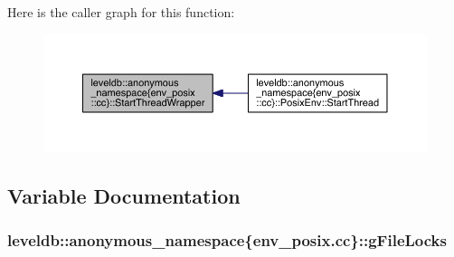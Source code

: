Here is the caller graph for this function\+:
\nopagebreak
\begin{figure}[H]
\begin{center}
\leavevmode
\includegraphics[width=350pt]{namespaceleveldb_1_1anonymous__namespace_02env__posix_8cc_03_a65e3f0fe7b0373024902f346f7df1bfe_icgraph}
\end{center}
\end{figure}




\subsection{Variable Documentation}
\hypertarget{namespaceleveldb_1_1anonymous__namespace_02env__posix_8cc_03_ae7dd8d96243a5abc6778648e20d1f729}{}
\subsubsection[{g\+File\+Locks}]{ leveldb\+::anonymous\+\_\+namespace\{env\+\_\+posix.\+cc\}\+::g\+File\+Locks\hspace{0.3cm}{\ttfamily [static]}}\label{namespaceleveldb_1_1anonymous__namespace_02env__posix_8cc_03_ae7dd8d96243a5abc6778648e20d1f729}
